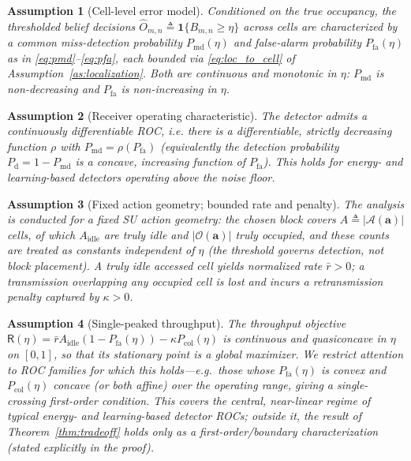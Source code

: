 \documentclass[journal]{IEEEtran}
\newtheorem{assumption}{Assumption}
\newcommand{\Ind}{\mathbf{1}}             %
\newcommand{\defeq}{\triangleq}
\newcommand{\occ}{O}                       %
\newcommand{\bel}{B}                       %
\newcommand{\Pmd}{P_{\mathrm{md}}}         %
\newcommand{\Pfa}{P_{\mathrm{fa}}}         %
\newcommand{\thr}{\eta}                    %
\newcommand{\act}{\bm{a}}                  %
\newcommand{\Pcol}{P_{\mathrm{col}}}       %
\newcommand{\thru}{\mathsf{R}}             %
\begin{document}
\begin{assumption}[Cell-level error model]
\label{as:cellerror}
Conditioned on the true occupancy, the thresholded belief decisions
$\hat{\occ}_{m,n}\defeq\Ind\{\bel_{m,n}\ge\thr\}$ across cells are
characterized by a common miss-detection probability $\Pmd(\thr)$ and
false-alarm probability $\Pfa(\thr)$ as in \eqref{eq:pmd}--\eqref{eq:pfa},
each bounded via \eqref{eq:loc_to_cell} of
Assumption~\ref{as:localization}. Both are continuous and monotonic in
$\thr$: $\Pmd$ is non-decreasing and $\Pfa$ is non-increasing in $\thr$.
\end{assumption}

\begin{assumption}[Receiver operating characteristic]
\label{as:roc}
The detector admits a continuously differentiable ROC, i.e. there is a
differentiable, strictly decreasing function $\rho$ with
$\Pmd = \rho(\Pfa)$ (equivalently the detection probability
$P_{\mathrm{d}}=1-\Pmd$ is a concave, increasing function of $\Pfa$). This
holds for energy- and learning-based detectors operating above the
noise floor.
\end{assumption}

\begin{assumption}[Fixed action geometry; bounded rate and penalty]
\label{as:rate}
The analysis is conducted for a \emph{fixed} SU action geometry: the chosen
block covers $A\defeq|\mathcal{A}(\act)|$ cells, of which $A_{\mathrm{idle}}$
are truly idle and $|\mathcal{O}(\act)|$ truly occupied, and these counts are
treated as constants independent of $\thr$ (the threshold governs detection,
not block placement). A truly idle accessed cell yields normalized rate
$\bar r>0$; a transmission overlapping any occupied cell is lost and incurs a
retransmission penalty captured by $\kappa>0$.
\end{assumption}

\begin{assumption}[Single-peaked throughput]
\label{as:concave}
The throughput objective $\thru(\thr)=\bar r A_{\mathrm{idle}}(1-\Pfa(\thr))
-\kappa\Pcol(\thr)$ is continuous and \emph{quasiconcave} in $\thr$ on
$[0,1]$, so that its stationary point is a global maximizer. We restrict
attention to ROC families for which this holds---e.g.\ those whose
$\Pfa(\thr)$ is convex and $\Pcol(\thr)$ concave (or both affine) over the
operating range, giving a single-crossing first-order condition. This covers
the central, near-linear regime of typical energy- and learning-based
detector ROCs; outside it, the result of Theorem~\ref{thm:tradeoff} holds
only as a first-order/boundary characterization (stated explicitly in the
proof).
\end{assumption}
\end{document}
